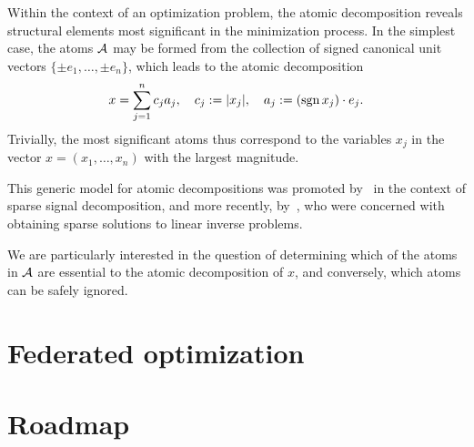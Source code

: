 Within the context of an optimization problem, the atomic decomposition reveals
structural elements most significant in the minimization process.
In the simplest case, the atoms $\mathcal{A}$ may be formed from the collection of
signed canonical unit vectors $\{\pm e_1,\ldots,\pm e_n\}$, which leads to the
atomic decomposition
\[
  x = \sum_{j=1}^n c_j a_j,
  \quad
  c_j: = |x_j|,
  \quad
  a_j:= (\operatorname{sgn} x_j)\cdot e_j.
\]
Trivially, the most significant atoms thus correspond to the variables $x_j$ in
the vector $x=(x_1,\ldots,x_n)$ with the largest magnitude.

This generic model for atomic decompositions was promoted by~\citet{cds98} in the context of sparse signal decomposition, and more recently, by~\citet{chandrasekaran2012convex}, who were concerned with obtaining sparse solutions to linear inverse problems. 

We are particularly interested in the question of determining which of the atoms
in $\mathcal{A}$ are essential to the atomic decomposition of $x$, and conversely,
which atoms can be safely ignored. 



\section{Federated optimization}


\section{Roadmap}


